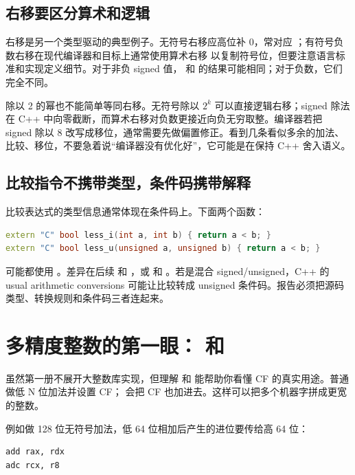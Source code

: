 \subsection{右移要区分算术和逻辑}

右移是另一个类型驱动的典型例子。无符号右移应高位补 0，常对应 ；有符号负数右移在现代编译器和目标上通常使用算术右移  以复制符号位，但要注意语言标准和实现定义细节。对于非负 signed 值， 和  的结果可能相同；对于负数，它们完全不同。

除以 2 的幂也不能简单等同右移。无符号除以 \(2^k\) 可以直接逻辑右移；signed 除法在 C++ 中向零截断，而算术右移对负数更接近向负无穷取整。编译器若把 signed 除以 8 改写成移位，通常需要先做偏置修正。看到几条看似多余的加法、比较、移位，不要急着说“编译器没有优化好”，它可能是在保持 C++ 舍入语义。

\subsection{比较指令不携带类型，条件码携带解释}

比较表达式的类型信息通常体现在条件码上。下面两个函数：

\begin{lstlisting}[language=C++]
extern "C" bool less_i(int a, int b) { return a < b; }
extern "C" bool less_u(unsigned a, unsigned b) { return a < b; }
\end{lstlisting}

可能都使用 。差异在后续  和 ，或  和 。若是混合 signed/unsigned，C++ 的 usual arithmetic conversions 可能让比较转成 unsigned 条件码。报告必须把源码类型、转换规则和条件码三者连起来。

\section{多精度整数的第一眼： 和 }

虽然第一册不展开大整数库实现，但理解  和  能帮助你看懂 CF 的真实用途。普通  做低 N 位加法并设置 CF； 会把 CF 也加进去。这样可以把多个机器字拼成更宽的整数。

例如做 128 位无符号加法，低 64 位相加后产生的进位要传给高 64 位：

\begin{lstlisting}
add rax, rdx
adc rcx, r8
\end{lstlisting}

